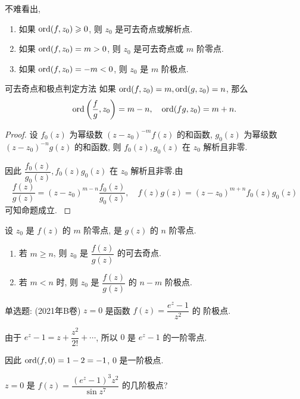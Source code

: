 不难看出,
\begin{enumerate}
	\item 如果 ${\mathrm{ord}}(f,z_0)\geqslant0$, 则 $z_0$ 是可去奇点或解析点.
	\item 如果 ${\mathrm{ord}}(f,z_0)=m>0$, 则 $z_0$ 是可去奇点或 $m$ 阶零点.
	\item 如果 ${\mathrm{ord}}(f,z_0)=-m<0$, 则 $z_0$ 是 $m$ 阶极点.
\end{enumerate}

\begin{alertblock}{可去奇点和极点判定方法}
	如果 ${\mathrm{ord}}(f,z_0)=m,{\mathrm{ord}}(g,z_0)=n$, 那么
	\[{\mathrm{ord}}\left(\frac fg,z_0\right)=m-n,\quad{\mathrm{ord}}(fg,z_0)=m+n.\]
\end{alertblock}

\begin{proof}
		设 $f_0(z)$ 为幂级数 $(z-z_0)^{-m}f(z)$ 的和函数, $g_0(z)$ 为幂级数 $(z-z_0)^{-n}g(z)$ 的和函数,
	{则 $f_0(z),g_0(z)$ 在 $z_0$ 解析且非零.
	}%

	{因此 $\dfrac{f_0(z)}{g_0(z)},f_0(z)g_0(z)$ 在 $z_0$ 解析且非零.由
		\[\frac{f(z)}{g(z)}=(z-z_0)^{m-n}\frac{f_0(z)}{g_0(z)},\quad
		f(z)g(z)=(z-z_0)^{m+n}f_0(z)g_0(z)\]
		可知命题成立.\qedhere
	}
\end{proof}

\begin{corollary}
	设 $z_0$ 是 $f(z)$ 的 $m$ 阶零点, 是 $g(z)$ 的 $n$ 阶零点.
	\begin{enumerate}
		\item 若 $m\ge n$, 则 $z_0$ 是 $\dfrac{f(z)}{g(z)}$ 的可去奇点.
		\item 若 $m<n$ 时, 则 $z_0$ 是 $\dfrac{f(z)}{g(z)}$ 的 $n-m$ 阶极点.
	\end{enumerate}
\end{corollary}

\begin{example}
	单选题: (2021年B卷) $z=0$ 是函数 $f(z)=\dfrac{e^z-1}{z^2}$ 的 阶极点.
\end{example}

\begin{solution}
		由于 $e^z-1=z+\dfrac{z^2}{2!}+\cdots$, 所以 $0$ 是 $e^z-1$ 的一阶零点.

	{因此 ${\mathrm{ord}}(f,0)=1-2=-1$, $0$ 是一阶极点.
	}
\end{solution}

\begin{example}
	$z=0$ 是 $f(z)=\dfrac{(e^z-1)^3z^2}{\sin z^7}$ 的几阶极点?
\end{example}

